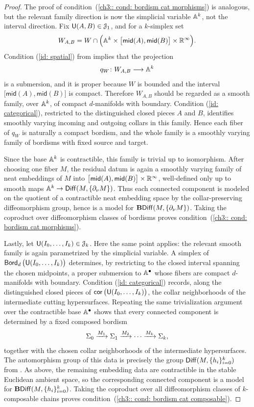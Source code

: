 \begin{proof}
    The proof of condition~(\ref{ch3:: cond: bordism cat morphisms}) is analogous, but the relevant family direction is now the simplicial variable $\AA^k$, not the interval direction. Fix $\sU(A,B)\in \cJ_1$, and for a $k$-simplex set
    \[
        W_{A,B}=W\cap \Big(\AA^k\times \big[\mathsf{mid}(A),\mathsf{mid}(B)\big]\times \RR^\infty\Big).
    \]
    Condition (\ref{id: spatial}) from  implies that the projection
    \[
        q_W \maps W_{A,B}\longra \AA^k
    \]
    is a submersion, and it is proper because $W$ is bounded and the interval $\big[\mathsf{mid}(A),\mathsf{mid}(B)\big]$ is compact. Therefore $W_{A,B}$ should be regarded as a smooth family, over $\AA^k$, of compact $d$-manifolds with boundary. Condition (\ref{id: categorical}), restricted to the distinguished closed pieces $A$ and $B$, identifies smoothly varying incoming and outgoing collars in this family. Hence each fiber of $q_W$ is naturally a compact bordism, and the whole family is a smoothly varying family of bordisms with fixed source and target.

    Since the base $\AA^k$ is contractible, this family is trivial up to isomorphism. After choosing one fiber $M$, the residual datum is again a smoothly varying family of neat embeddings of $M$ into $\big[\mathsf{mid}(A),\mathsf{mid}(B)\big]\times \RR^\infty$, well-defined only up to smooth maps $\AA^k\to \Diff(M,\{\partial_\nu M\})$. Thus each connected component is modeled on the quotient of a contractible neat embedding space by the collar-preserving diffeomorphism group, hence is a model for $\mathbf{B}\!\Diff(M,\{\partial_\nu M\})$. Taking the coproduct over diffeomorphism classes of bordisms proves condition~(\ref{ch3:: cond: bordism cat morphisms}).

    Lastly, let $\sU(I_0,\ldots,I_k)\in \cJ_k$. Here the same point applies: the relevant smooth family is again parametrized by the simplicial variable. A simplex of $\bord_d\big(\sU(I_0,\ldots,I_k)\big)$ determines, by restricting to the closed interval spanning the chosen midpoints, a proper submersion to $\AA^\bullet$ whose fibers are compact $d$-manifolds with boundary. Condition (\ref{id: categorical}) records, along the distinguished closed pieces of $\core\big(\sU(I_0,\ldots,I_k)\big)$, the collar neighborhoods of the intermediate cutting hypersurfaces. Repeating the same trivialization argument over the contractible base $\AA^\bullet$ shows that every connected component is determined by a fixed composed bordism
    \[
        \Sigma_0 \xra{M_1} \Sigma_1 \xra{M_2} \cdots \xra{M_k} \Sigma_k,
    \]
    together with the chosen collar neighborhoods of the intermediate hypersurfaces. The automorphism group of this data is precisely the group $\Diff(M,\{h_i\}_{i=0}^{k})$ from . As above, the remaining embedding data are contractible in the stable Euclidean ambient space, so the corresponding connected component is a model for $\mathbf{B}\!\Diff(M,\{h_i\}_{i=0}^{k})$. Taking the coproduct over all diffeomorphism classes of $k$-composable chains proves condition~(\ref{ch3:: cond: bordism cat composable}).


\end{proof}
